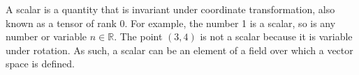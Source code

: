 \documentclass[12pt]{article}
\begin{document}
A scalar is a quantity that is invariant under coordinate transformation, also known as a tensor of rank 0. For example, the number 1 is a scalar, so is any number or variable $n\in\mathbb{R}$. The point $(3,4)$ is not a scalar because it is variable under rotation.
As such, a scalar can be an element of a field over which a vector space is defined.
\end{document}
